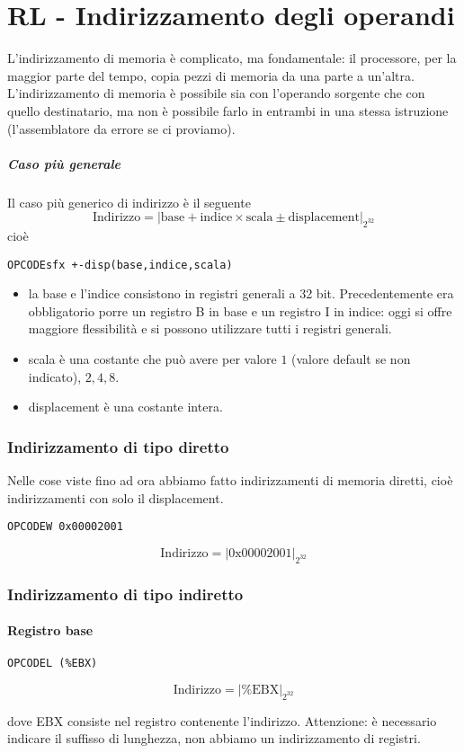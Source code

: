 
\chapter{RL - Indirizzamento degli operandi}
L'indirizzamento di memoria è complicato, ma fondamentale: il processore, per la maggior parte del tempo, copia pezzi di memoria da una parte a un'altra. L'indirizzamento di memoria è possibile sia con l'operando sorgente che con quello destinatario, ma non è possibile farlo in entrambi in una stessa istruzione (l'assemblatore da errore se ci proviamo). 
\paragraph{Caso più generale} Il caso più generico di indirizzo è il seguente
\[\text{Indirizzo}=\left|\text{base}+\text{indice}\times\text{scala} \pm \text{displacement}\right|_{2^{32}}\]
cioè 
\begin{verbatim}OPCODEsfx +-disp(base,indice,scala)\end{verbatim}
\begin{itemize}
	\item la base e l'indice consistono in registri generali a 32 bit. Precedentemente era obbligatorio porre un registro B in base e un registro I in indice: oggi si offre maggiore flessibilità e si possono utilizzare tutti i registri generali.
	\item scala è una costante che può avere per valore $1$ (valore default se non indicato), $2,4,8$.
	\item displacement è una costante intera. 
\end{itemize}
\subsection*{Indirizzamento di tipo diretto}
Nelle cose viste fino ad ora abbiamo fatto indirizzamenti di memoria diretti, cioè indirizzamenti con solo il displacement.
\begin{multicols}{2}
	\begin{verbatim}OPCODEW 0x00002001\end{verbatim}
	\[\text{Indirizzo}=\left| \text{0x00002001}\right|_{2^{32}}\]
\end{multicols}
\subsection*{Indirizzamento di tipo indiretto}
\subsubsection*{Registro base} 
\begin{multicols}{2}
	\begin{verbatim}OPCODEL (%EBX)
	\end{verbatim}
	\[\text{Indirizzo}=\left|\text{\%EBX}\right|_{2^{32}}\]
\end{multicols}
\noindent dove EBX consiste nel registro contenente l'indirizzo. Attenzione: è necessario indicare il suffisso di lunghezza, non abbiamo un indirizzamento di registri.
\clearpage 
